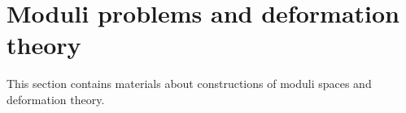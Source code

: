 \documentclass[../main.tex]{subfiles}
\begin{document}
\section{Moduli problems and deformation theory}
This section contains materials about constructions of moduli spaces and deformation theory.
\end{document}
